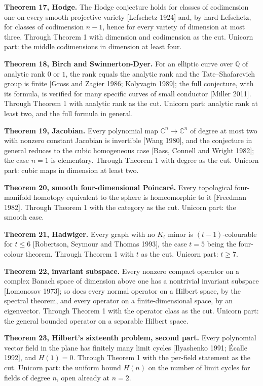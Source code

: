 \documentclass[10pt]{article}
\begin{document}
\textbf{Theorem 17, Hodge.} The Hodge conjecture holds for classes of
codimension one on every smooth projective variety {[}Lefschetz 1924{]}
and, by hard Lefschetz, for classes of codimension \(n - 1\), hence for
every variety of dimension at most three. Through Theorem 1 with
dimension and codimension as the cut. Unicorn part: the middle
codimensions in dimension at least four.

\textbf{Theorem 18, Birch and Swinnerton-Dyer.} For an elliptic curve
over \(\mathbb{Q}\) of analytic rank \(0\) or \(1\), the rank equals the
analytic rank and the Tate--Shafarevich group is finite {[}Gross and
Zagier 1986; Kolyvagin 1989{]}; the full conjecture, with its formula,
is verified for many specific curves of small conductor {[}Miller
2011{]}. Through Theorem 1 with analytic rank as the cut. Unicorn part:
analytic rank at least two, and the full formula in general.

\textbf{Theorem 19, Jacobian.} Every polynomial map
\(\mathbb{C}^n \to \mathbb{C}^n\) of degree at most two with nonzero
constant Jacobian is invertible {[}Wang 1980{]}, and the conjecture in
general reduces to the cubic homogeneous case {[}Bass, Connell and
Wright 1982{]}; the case \(n = 1\) is elementary. Through Theorem 1 with
degree as the cut. Unicorn part: cubic maps in dimension at least two.

\textbf{Theorem 20, smooth four-dimensional Poincaré.} Every topological
four-manifold homotopy equivalent to the sphere is homeomorphic to it
{[}Freedman 1982{]}. Through Theorem 1 with the category as the cut.
Unicorn part: the smooth case.

\textbf{Theorem 21, Hadwiger.} Every graph with no \(K_t\) minor is
\((t-1)\)-colourable for \(t \le 6\) {[}Robertson, Seymour and Thomas
1993{]}, the case \(t = 5\) being the four-colour theorem. Through
Theorem 1 with \(t\) as the cut. Unicorn part: \(t \ge 7\).

\textbf{Theorem 22, invariant subspace.} Every nonzero compact operator
on a complex Banach space of dimension above one has a nontrivial
invariant subspace {[}Lomonosov 1973{]}; so does every normal operator
on a Hilbert space, by the spectral theorem, and every operator on a
finite-dimensional space, by an eigenvector. Through Theorem 1 with the
operator class as the cut. Unicorn part: the general bounded operator on
a separable Hilbert space.

\textbf{Theorem 23, Hilbert's sixteenth problem, second part.} Every
polynomial vector field in the plane has finitely many limit cycles
{[}Ilyashenko 1991; Écalle 1992{]}, and \(H(1) = 0\). Through Theorem 1
with the per-field statement as the cut. Unicorn part: the uniform bound
\(H(n)\) on the number of limit cycles for fields of degree \(n\), open
already at \(n = 2\).
\end{document}
